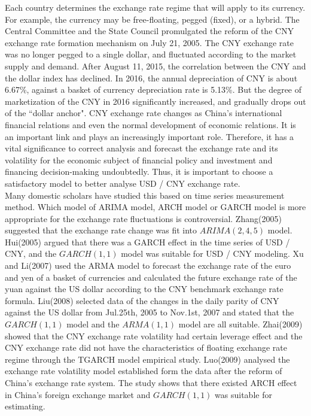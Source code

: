 \documentclass[12pt, a4paper, titlepage]{article}
\begin{document}
Each country determines the exchange rate regime that will apply to its currency. For example, the currency may be free-floating, pegged (fixed), or a hybrid. The Central Committee and the State Council promulgated the reform of the CNY exchange rate formation mechanism on July 21, 2005. The CNY exchange rate was no longer pegged to a single dollar, and fluctuated according to the market supply and demand. After August 11, 2015, the correlation between the CNY and the dollar index has declined. In 2016, the annual depreciation of CNY is about 6.67\%, against a basket of currency depreciation rate is 5.13\%. But the degree of marketization of the CNY in 2016 significantly increased, and gradually drops out of the ``dollar anchor". CNY exchange rate changes as China's international financial relations and even the normal development of economic relations. It is an important link and plays an increasingly important role. Therefore, it has a vital significance to correct analysis and forecast the exchange rate and its volatility for the economic subject of financial policy and investment and financing decision-making undoubtedly. Thus, it is important to choose a satisfactory model to better analyse USD / CNY exchange rate.\\

Many domestic scholars have studied this based on time series measurement method. Which model of ARIMA model, ARCH model or GARCH model is more appropriate for the exchange rate fluctuations is controversial. Zhang(2005) suggested that the exchange rate change was fit into $ARIMA(2,4,5)$ model. Hui(2005) argued that there was a GARCH effect in the time series of USD / CNY, and the $GARCH(1,1)$ model was suitable for USD / CNY modeling. Xu and Li(2007) used the ARMA model to forecast the exchange rate of the euro and yen of a basket of currencies and calculated the future exchange rate of the yuan against the US dollar according to the CNY benchmark exchange rate formula. Liu(2008) selected data of the changes in the daily parity of CNY against the US dollar from Jul.25th, 2005 to Nov.1st, 2007 and stated that the $GARCH(1,1)$ model and the $ARMA(1,1)$ model are all suitable. Zhai(2009) showed that the CNY exchange rate volatility had certain leverage effect and the CNY exchange rate did not have the characteristics of floating exchange rate regime through the TGARCH model empirical study. Luo(2009) analysed the exchange rate volatility model established form the data after the reform of China's exchange rate system. The study shows that there existed ARCH effect in China's foreign exchange market and $GARCH(1,1)$ was suitable for estimating.\\
\end{document}
